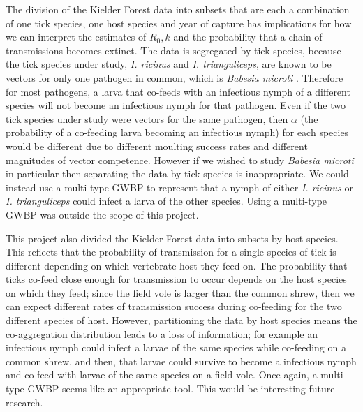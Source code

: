 \documentclass[hidelinks]{article}
\begin{document}
The division of the Kielder Forest data into subsets that are each a combination of one tick species, one host species and year of capture has implications for how we can interpret the estimates of $ R_0, k $ and the probability that a chain of transmissions becomes extinct. The data is segregated by tick species, because the tick species under study, \textit{I. ricinus} and \textit{I. trianguliceps}, are known to be vectors for only one pathogen in common, which is \textit{Babesia microti} \citep{Gray2024, Rubel_2023}. Therefore for most pathogens, a larva that co-feeds with an infectious nymph of a different species will not become an infectious nymph for that pathogen. Even if the two tick species under study were vectors for the same pathogen, then $ \alpha $ (the probability of a co-feeding larva becoming an infectious nymph) for each species would be different due to different moulting success rates and different magnitudes of vector competence. However if we wished to study \textit{Babesia microti} in particular then separating the data by tick species is inappropriate. We could instead use a multi-type GWBP to represent that a nymph of either \textit{I. ricinus} or \textit{I. trianguliceps} could infect a larva of the other species. Using a multi-type GWBP was outside the scope of this project.

This project also divided the Kielder Forest data into subsets by host species. This reflects that the probability of transmission for a single species of tick is different depending on which vertebrate host they feed on. The probability that ticks co-feed close enough for transmission to occur depends on the host species on which they feed; since the field vole is larger than the common shrew, then we can expect different rates of transmission success during co-feeding for the two different species of host. However, partitioning the data by host species means the co-aggregation distribution leads to a loss of information; for example an infectious nymph could infect a larvae of the same species while co-feeding on a common shrew, and then, that larvae could survive to become a infectious nymph and co-feed with larvae of the same species on a field vole. Once again, a multi-type GWBP seems like an appropriate tool. This would be interesting future research.
\end{document}
